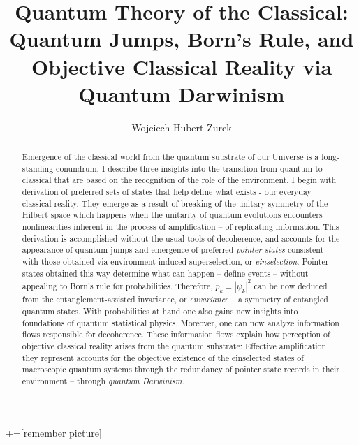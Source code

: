 \documentclass[aps,amsmath,amssymb,amsfonts,12pt]{revtex4-1}
\newcommand{\+}         {\dagger}
\begin{document}
+=[remember picture]

\title{Quantum Theory of the Classical: Quantum Jumps, Born's Rule, and \\ 
Objective Classical Reality via Quantum Darwinism}

\author{Wojciech Hubert Zurek}

\address{Theory Division, MS B213, LANL
    Los Alamos, NM, 87545, U.S.A.}


\begin{abstract} Emergence of the classical world from the quantum substrate of our Universe is a long-standing conundrum. 
I describe three insights into the transition from quantum to classical that are based on the recognition of the role of the environment. 
I begin with derivation of preferred sets of states that help define what exists - our everyday classical reality. They emerge as a result of breaking of the unitary symmetry of the Hilbert
space which happens when the unitarity of quantum evolutions encounters nonlinearities inherent in the process of amplification -- of replicating information.
 This derivation is accomplished without the usual tools of decoherence, and accounts for the appearance of quantum jumps and emergence of preferred {\it pointer states}
consistent with those obtained via environment-induced superselection, or {\it einselection}. Pointer states obtained this way determine what can happen -- define 
events -- without appealing to Born's rule for probabilities. Therefore, $p_k=|\psi_k|^2$ can be now deduced from the entanglement-assisted invariance, or {\it envariance} 
-- a symmetry of entangled quantum states. With probabilities at hand one also gains new insights into foundations of quantum statistical physics. Moreover, one can now
analyze information flows responsible for decoherence. These information flows explain how perception of objective classical reality arises from the quantum substrate: Effective amplification they represent accounts for the objective existence of the einselected states of macroscopic quantum systems through the redundancy of pointer state records in their
environment -- through {\it quantum Darwinism}. 
\end{abstract}
\maketitle
\end{document}
